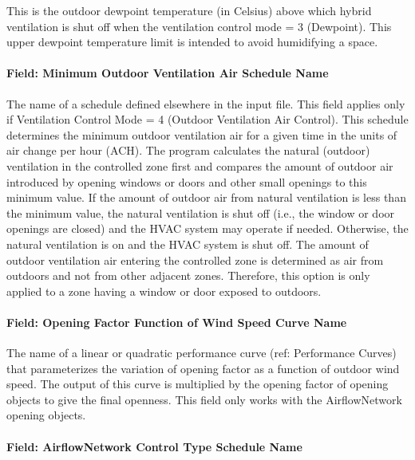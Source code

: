 This is the outdoor dewpoint temperature (in Celsius) above which hybrid ventilation is shut off when the ventilation control mode = 3 (Dewpoint). This upper dewpoint temperature limit is intended to avoid humidifying a space.

\paragraph{Field: Minimum Outdoor Ventilation Air Schedule Name}\label{field-minimum-outdoor-ventilation-air-schedule-name}

The name of a schedule defined elsewhere in the input file. This field applies only if Ventilation Control Mode = 4 (Outdoor Ventilation Air Control). This schedule determines the minimum outdoor ventilation air for a given time in the units of air change per hour (ACH). The program calculates the natural (outdoor) ventilation in the controlled zone first and compares the amount of outdoor air introduced by opening windows or doors and other small openings to this minimum value. If the amount of outdoor air from natural ventilation is less than the minimum value, the natural ventilation is shut off (i.e., the window or door openings are closed) and the HVAC system may operate if needed. Otherwise, the natural ventilation is on and the HVAC system is shut off. The amount of outdoor ventilation air entering the controlled zone is determined as air from outdoors and not from other adjacent zones. Therefore, this option is only applied to a zone having a window or door exposed to outdoors.

\paragraph{Field: Opening Factor Function of Wind Speed Curve Name}\label{field-opening-factor-function-of-wind-speed-curve-name}

The name of a linear or quadratic performance curve (ref: Performance Curves) that parameterizes the variation of opening factor as a function of outdoor wind speed. The output of this curve is multiplied by the opening factor of opening objects to give the final openness. This field only works with the AirflowNetwork opening objects.

\paragraph{Field: AirflowNetwork Control Type Schedule Name}\label{field-airflownetwork-control-type-schedule-name}

